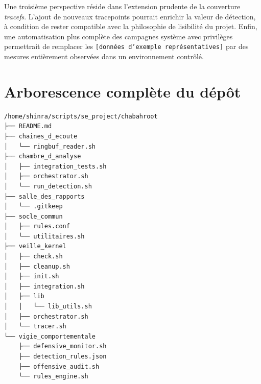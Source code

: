 \documentclass[12pt,a4paper]{report}
\newcommand{\tracefs}{\textit{tracefs}}
\begin{document}
Une troisième perspective réside dans l’extension prudente de la couverture \tracefs. L’ajout de nouveaux tracepoints pourrait enrichir la valeur de détection, à condition de rester compatible avec la philosophie de lisibilité du projet. Enfin, une automatisation plus complète des campagnes système avec privilèges permettrait de remplacer les \texttt{[données d'exemple représentatives]} par des mesures entièrement observées dans un environnement contrôlé.

\printbibliography[heading=bibintoc,title={Bibliographie}]

\appendix

\chapter{Arborescence complète du dépôt}
\begin{verbatim}
/home/shinra/scripts/se_project/chabahroot
├── README.md
├── chaines_d_ecoute
│   └── ringbuf_reader.sh
├── chambre_d_analyse
│   ├── integration_tests.sh
│   ├── orchestrator.sh
│   └── run_detection.sh
├── salle_des_rapports
│   └── .gitkeep
├── socle_commun
│   ├── rules.conf
│   └── utilitaires.sh
├── veille_kernel
│   ├── check.sh
│   ├── cleanup.sh
│   ├── init.sh
│   ├── integration.sh
│   ├── lib
│   │   └── lib_utils.sh
│   ├── orchestrator.sh
│   └── tracer.sh
└── vigie_comportementale
    ├── defensive_monitor.sh
    ├── detection_rules.json
    ├── offensive_audit.sh
    └── rules_engine.sh
\end{verbatim}
\end{document}
